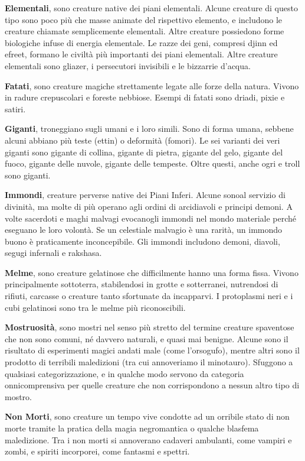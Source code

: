 \begin{multicols}{2}
\medskip\textbf{Elementali}, sono creature native dei piani elementali. Alcune creature di questo tipo sono poco più che masse animate del rispettivo elemento, e includono le creature chiamate semplicemente elementali. Altre creature possiedono forme biologiche infuse di energia elementale. Le razze dei geni, compresi djinn ed efreet, formano le civiltà più importanti dei piani elementali. Altre creature elementali sono gliazer, i persecutori  invisibili e le bizzarrie d'acqua. 

\medskip\textbf{Fatati}, sono creature magiche strettamente legate alle forze della natura. Vivono in radure crepuscolari e foreste nebbiose. Esempi di fatati sono driadi, pixie e satiri.

\medskip\textbf{Giganti}, troneggiano sugli umani e i loro simili. Sono di forma umana, sebbene alcuni abbiano più teste (ettin) o deformità (fomori). Le sei varianti dei veri giganti sono gigante di collina, gigante di pietra, gigante del gelo, gigante del fuoco, gigante delle nuvole, gigante delle tempeste. Oltre questi, anche ogri e troll sono giganti. 

\medskip\textbf{Immondi}, creature perverse native dei Piani Inferi. Alcune sonoal servizio di  divinità, ma molte di più operano agli ordini di arcidiavoli e principi demoni. A volte sacerdoti e maghi malvagi evocanogli immondi nel mondo materiale perché eseguano le loro volontà. Se un celestiale malvagio è una rarità, un immondo buono è praticamente inconcepibile. Gli immondi includono demoni, diavoli, segugi infernali e rakshasa. 

\medskip\textbf{Melme}, sono creature gelatinose che difficilmente hanno una forma fissa. Vivono principalmente sottoterra, stabilendosi in grotte e sotterranei, nutrendosi di rifiuti, carcasse o creature tanto sfortunate da incapparvi. I protoplasmi neri e i cubi gelatinosi sono tra le melme più riconoscibili.

\medskip\textbf{Mostruosità}, sono mostri nel senso più stretto del termine creature spaventose che non sono comuni, né davvero naturali, e quasi mai benigne. Alcune sono il risultato di esperimenti magici andati male (come l'orsogufo), mentre altri sono il prodotto di terribili maledizioni (tra cui annoveriamo il minotauro). Sfuggono a qualsiasi categorizzazione, e in qualche modo servono da categoria onnicomprensiva per quelle creature che non corrispondono a nessun altro tipo di mostro. 

\medskip\textbf{Non Morti}, sono creature un tempo vive condotte ad un orribile stato di non morte tramite la pratica della magia negromantica o qualche blasfema maledizione. Tra i non morti si annoverano cadaveri ambulanti, come vampiri e zombi, e spiriti incorporei, come fantasmi e spettri.


\end{multicols}

